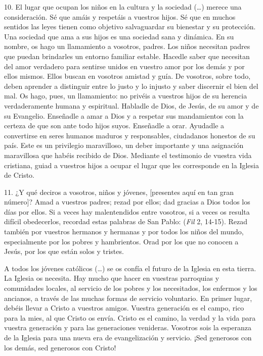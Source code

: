 \begin{body}
					10. El lugar que ocupan los niños en la cultura y la sociedad (\ldots{}) merece una consideración. Sé que amáis y respetáis a vuestros hijos. Sé que en muchos sentidos las leyes tienen como objetivo salvaguardar su bienestar y su protección. Una sociedad que ama a sus hijos es una sociedad sana y dinámica. En su nombre, os hago un llamamiento a vosotros, padres. Los niños necesitan padres que puedan brindarles un entorno familiar estable. Hacedle saber que necesitan del amor verdadero para sentirse unidos en vuestro amor por los demás y por ellos mismos. Ellos buscan en vosotros amistad y guía. De vosotros, sobre todo, deben aprender a distinguir entre lo justo y lo injusto y saber discernir el bien del mal. Os hago, pues, un llamamiento: no privéis a vuestros hijos de su herencia verdaderamente humana y espiritual. Habladle de Dios, de Jesús, de su amor y de su Evangelio. Enseñadle a amar a Dios y a respetar sus mandamientos con la certeza de que son ante todo hijos suyos. Enseñadle a orar. Ayudadle a convertirse en seres humanos maduros y responsables, ciudadanos honestos de su país. Este es un privilegio maravilloso, un deber importante y una asignación maravillosa que habéis recibido de Dios. Mediante el testimonio de vuestra vida cristiana, guiad a vuestros hijos a ocupar el lugar que les corresponde en la Iglesia de Cristo.
					
					11. ¿Y qué deciros a vosotros, niños y jóvenes, {[}presentes aquí en tan gran número{]}? Amad a vuestros padres; rezad por ellos; dad gracias a Dios todos los días por ellos. Si a veces hay malentendidos entre vosotros, si a veces os resulta difícil obedecerlos, recordad estas palabras de San Pablo:  (\emph{Fil} 2, 14-15). Rezad también por vuestros hermanos y hermanas y por todos los niños del mundo, especialmente por los pobres y hambrientos. Orad por los que no conocen a Jesús, por los que están solos y tristes.
					
					A todos los jóvenes católicos (\ldots{}) se os confía el futuro de la Iglesia en esta tierra. La Iglesia os necesita. Hay mucho que hacer en vuestras parroquias y comunidades locales, al servicio de los pobres y los necesitados, los enfermos y los ancianos, a través de las muchas formas de servicio voluntario. En primer lugar, debéis llevar a Cristo a vuestros amigos. Vuestra generación es el campo, rico para la mies, al que Cristo os envía. Cristo es el camino, la verdad y la vida para vuestra generación y para las generaciones venideras. Vosotros sois la esperanza de la Iglesia para una nueva era de evangelización y servicio. ¡Sed generosos con los demás, sed generosos con Cristo!
					

\end{body}
